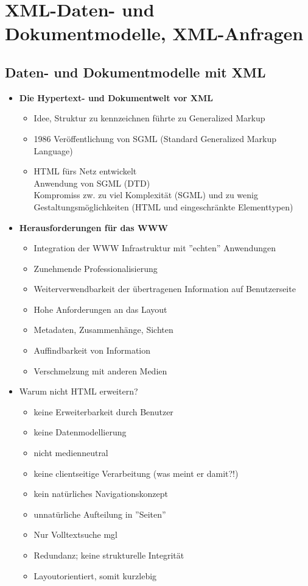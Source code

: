 \section{XML-Daten- und Dokumentmodelle, XML-Anfragen}

\subsection{Daten- und Dokumentmodelle mit XML}
\begin{itemize}
	\item \textbf{Die Hypertext- und Dokumentwelt vor XML}
	\begin{itemize}
		\item Idee, Struktur zu kennzeichnen führte zu Generalized Markup
		\item 1986 Veröffentlichung von SGML (Standard Generalized Markup Language)
		\item HTML fürs Netz entwickelt\\
		Anwendung von SGML (DTD)\\
		Kompromiss zw. zu viel Komplexität (SGML) und zu wenig Gestaltungsmöglichkeiten (HTML und eingeschränkte Elementtypen)
	\end{itemize}
	
	\item \textbf{Herausforderungen für das WWW}
	\begin{itemize}
		\item Integration der WWW Infrastruktur mit ''echten'' Anwendungen
		\item Zunehmende Professionalisierung
		\item Weiterverwendbarkeit der übertragenen Information auf Benutzerseite
		\item Hohe Anforderungen an das Layout
		\item Metadaten, Zusammenhänge, Sichten
		\item Auffindbarkeit von Information
		\item Verschmelzung mit anderen Medien
	\end{itemize}
	
	\item Warum nicht HTML erweitern?
	\begin{itemize}
		\item keine Erweiterbarkeit durch Benutzer
		\item keine Datenmodellierung
		\item nicht medienneutral
		\item keine clientseitige Verarbeitung {\tiny(was meint er damit?!)}
		\item kein natürliches Navigationskonzept
		\item unnatürliche Aufteilung in ''Seiten''
		\item Nur Volltextsuche mgl
		\item Redundanz; keine strukturelle Integrität
		\item Layoutorientiert, somit kurzlebig
	\end{itemize}
	

\end{itemize}
